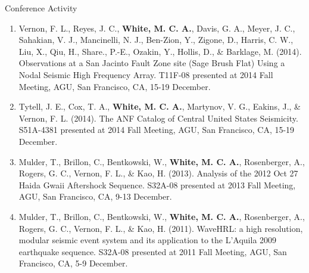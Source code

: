 \begin{rSection}{Conference Activity}
\begin{enumerate}
			\item Vernon, F. L., Reyes, J. C., \textbf{White, M. C. A.}, Davis, G. A., Meyer, J. C., Sahakian, V. J., Mancinelli, N. J., Ben-Zion, Y., Zigone, D., Harris, C. W., Liu, X., Qiu, H., Share., P.-E., Ozakin, Y., Hollis, D., \& Barklage, M. (2014). Observations at a San Jacinto Fault Zone site (Sage Brush Flat) Using a Nodal Seismic High Frequency Array. T11F-08 presented at 2014 Fall Meeting, AGU, San Francisco, CA, 15-19 December.
			
			\item Tytell, J. E., Cox, T. A., \textbf{White, M. C. A.}, Martynov, V. G., Eakins, J., \& Vernon, F. L. (2014). The ANF Catalog of Central United States Seismicity. S51A-4381 presented at 2014 Fall Meeting, AGU, San Francisco, CA, 15-19 December.
			
			\item Mulder, T., Brillon, C., Bentkowski, W., \textbf{White, M. C. A.}, Rosenberger, A., Rogers, G. C., Vernon, F. L., \& Kao, H. (2013). Analysis of the 2012 Oct 27 Haida Gwaii Aftershock Sequence. S32A-08 presented at 2013 Fall Meeting, AGU, San Francisco, CA, 9-13 December.
			
			\item Mulder, T., Brillon, C., Bentkowski, W., \textbf{White, M. C. A.}, Rosenberger, A., Rogers, G. C., Vernon, F. L., \& Kao, H. (2011). WaveHRL: a high resolution, modular seismic event system and its application to the L'Aquila 2009 earthquake sequence. S32A-08 presented at 2011 Fall Meeting, AGU, San Francisco, CA, 5-9 December.
		\end{enumerate}
\end{rSection}